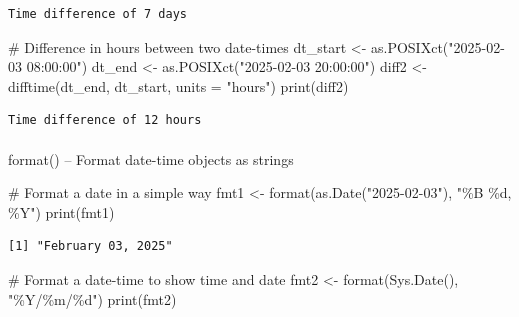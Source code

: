 \documentclass[
  letterpaper,
  DIV=11,
  numbers=noendperiod]{scrartcl}
\makeatletter
\let\oldparagraph\paragraph
\renewcommand{\paragraph}{
    \@ifstar
      \xxxParagraphStar
      \xxxParagraphNoStar
  }
\newcommand{\xxxParagraphStar}[1]{\oldparagraph*{#1}\mbox{}}
\newcommand{\xxxParagraphNoStar}[1]{\oldparagraph{#1}\mbox{}}
\newenvironment{Shaded}{\begin{snugshade}}{\end{snugshade}}
\newcommand{\AttributeTok}[1]{\textcolor[rgb]{0.40,0.45,0.13}{#1}}
\newcommand{\CommentTok}[1]{\textcolor[rgb]{0.37,0.37,0.37}{#1}}
\newcommand{\FunctionTok}[1]{\textcolor[rgb]{0.28,0.35,0.67}{#1}}
\newcommand{\NormalTok}[1]{\textcolor[rgb]{0.00,0.23,0.31}{#1}}
\newcommand{\OtherTok}[1]{\textcolor[rgb]{0.00,0.23,0.31}{#1}}
\newcommand{\StringTok}[1]{\textcolor[rgb]{0.13,0.47,0.30}{#1}}
\makeatother
\begin{document}
\begin{verbatim}
Time difference of 7 days
\end{verbatim}

\begin{Shaded}
\begin{Highlighting}[]
\CommentTok{\#   Difference in hours between two date{-}times}
\NormalTok{dt\_start }\OtherTok{\textless{}{-}} \FunctionTok{as.POSIXct}\NormalTok{(}\StringTok{"2025{-}02{-}03 08:00:00"}\NormalTok{)}
\NormalTok{dt\_end   }\OtherTok{\textless{}{-}} \FunctionTok{as.POSIXct}\NormalTok{(}\StringTok{"2025{-}02{-}03 20:00:00"}\NormalTok{)}
\NormalTok{diff2 }\OtherTok{\textless{}{-}} \FunctionTok{difftime}\NormalTok{(dt\_end, dt\_start, }\AttributeTok{units =} \StringTok{"hours"}\NormalTok{)}
\FunctionTok{print}\NormalTok{(diff2)}
\end{Highlighting}
\end{Shaded}

\begin{verbatim}
Time difference of 12 hours
\end{verbatim}

\paragraph{format() -- Format date-time objects as
strings}\label{format-format-date-time-objects-as-strings}

\begin{Shaded}
\begin{Highlighting}[]
\CommentTok{\#   Format a date in a simple way}
\NormalTok{fmt1 }\OtherTok{\textless{}{-}} \FunctionTok{format}\NormalTok{(}\FunctionTok{as.Date}\NormalTok{(}\StringTok{"2025{-}02{-}03"}\NormalTok{), }\StringTok{"\%B \%d, \%Y"}\NormalTok{)}
\FunctionTok{print}\NormalTok{(fmt1)}
\end{Highlighting}
\end{Shaded}

\begin{verbatim}
[1] "February 03, 2025"
\end{verbatim}

\begin{Shaded}
\begin{Highlighting}[]
\CommentTok{\#   Format a date{-}time to show time and date}
\NormalTok{fmt2 }\OtherTok{\textless{}{-}} \FunctionTok{format}\NormalTok{(}\FunctionTok{Sys.Date}\NormalTok{(), }\StringTok{"\%Y/\%m/\%d"}\NormalTok{)}
\FunctionTok{print}\NormalTok{(fmt2)}
\end{Highlighting}
\end{Shaded}
\end{document}
